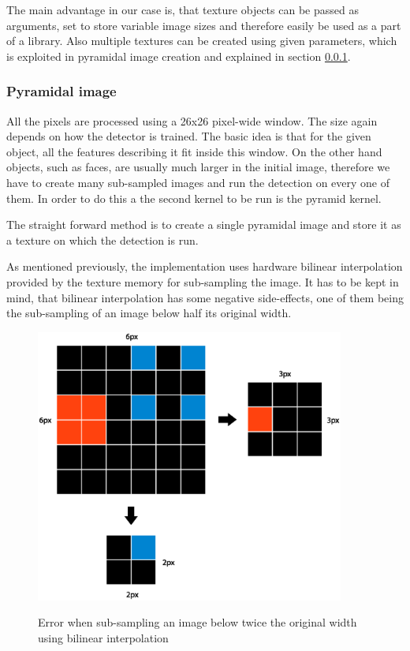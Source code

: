 The main advantage in our case is, that texture objects can be passed as arguments, set to store variable image sizes and therefore easily be used as a part of a library. Also multiple textures can be created using given parameters, which is exploited in pyramidal image creation and explained in section \ref{subsubsec:pyramidal}.

\subsubsection{Pyramidal image}\label{subsubsec:pyramidal}

All the pixels are processed using a 26x26 pixel-wide window. The size again depends on how the detector is trained. The basic idea is that for the given object, all the features describing it fit inside this window. On the other hand objects, such as faces, are usually much larger in the initial image, therefore we have to create many sub-sampled images and run the detection on every one of them. In order to do this a the second kernel to be run is the pyramid kernel.

The straight forward method is to create a single pyramidal image and store it as a texture on which the detection is run.

As mentioned previously, the implementation uses hardware bilinear interpolation provided by the texture memory for sub-sampling the image. It has to be kept in mind, that bilinear interpolation has some negative side-effects, one of them being the sub-sampling of an image below half its original width.

\begin{center}
\begin{figure}[ht]
	\centering\includegraphics[height=9cm]{fig/bilinear_error.eps}\label{fig:bilinear-error}
	\caption{Error when sub-sampling an image below twice the original width using bilinear interpolation}
\end{figure}
\end{center}

